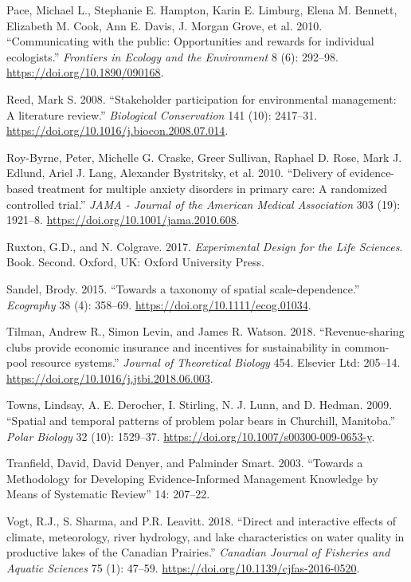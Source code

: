 \documentclass[fleqn,10pt]{wlpeerj} %
\begin{document}
\leavevmode\hypertarget{ref-Pace2010}{}%
Pace, Michael L., Stephanie E. Hampton, Karin E. Limburg, Elena M.
Bennett, Elizabeth M. Cook, Ann E. Davis, J. Morgan Grove, et al. 2010.
``Communicating with the public: Opportunities and rewards for
individual ecologists.'' \emph{Frontiers in Ecology and the Environment}
8 (6): 292--98. \url{https://doi.org/10.1890/090168}.

\leavevmode\hypertarget{ref-Reed2008}{}%
Reed, Mark S. 2008. ``Stakeholder participation for environmental
management: A literature review.'' \emph{Biological Conservation} 141
(10): 2417--31. \url{https://doi.org/10.1016/j.biocon.2008.07.014}.

\leavevmode\hypertarget{ref-Roy-Byrne2010}{}%
Roy-Byrne, Peter, Michelle G. Craske, Greer Sullivan, Raphael D. Rose,
Mark J. Edlund, Ariel J. Lang, Alexander Bystritsky, et al. 2010.
``Delivery of evidence-based treatment for multiple anxiety disorders in
primary care: A randomized controlled trial.'' \emph{JAMA - Journal of
the American Medical Association} 303 (19): 1921--8.
\url{https://doi.org/10.1001/jama.2010.608}.

\leavevmode\hypertarget{ref-Ruxton2017}{}%
Ruxton, G.D., and N. Colgrave. 2017. \emph{Experimental Design for the
Life Sciences}. Book. Second. Oxford, UK: Oxford University Press.

\leavevmode\hypertarget{ref-Sandel2015}{}%
Sandel, Brody. 2015. ``Towards a taxonomy of spatial scale-dependence.''
\emph{Ecography} 38 (4): 358--69.
\url{https://doi.org/10.1111/ecog.01034}.

\leavevmode\hypertarget{ref-Tilman2018}{}%
Tilman, Andrew R., Simon Levin, and James R. Watson. 2018.
``Revenue-sharing clubs provide economic insurance and incentives for
sustainability in common-pool resource systems.'' \emph{Journal of
Theoretical Biology} 454. Elsevier Ltd: 205--14.
\url{https://doi.org/10.1016/j.jtbi.2018.06.003}.

\leavevmode\hypertarget{ref-Towns2009}{}%
Towns, Lindsay, A. E. Derocher, I. Stirling, N. J. Lunn, and D. Hedman.
2009. ``Spatial and temporal patterns of problem polar bears in
Churchill, Manitoba.'' \emph{Polar Biology} 32 (10): 1529--37.
\url{https://doi.org/10.1007/s00300-009-0653-y}.

\leavevmode\hypertarget{ref-Tranfield2003}{}%
Tranfield, David, David Denyer, and Palminder Smart. 2003. ``Towards a
Methodology for Developing Evidence-Informed Management Knowledge by
Means of Systematic Review'' 14: 207--22.

\leavevmode\hypertarget{ref-Vogt2018}{}%
Vogt, R.J., S. Sharma, and P.R. Leavitt. 2018. ``Direct and interactive
effects of climate, meteorology, river hydrology, and lake
characteristics on water quality in productive lakes of the Canadian
Prairies.'' \emph{Canadian Journal of Fisheries and Aquatic Sciences} 75
(1): 47--59. \url{https://doi.org/10.1139/cjfas-2016-0520}.
\end{document}
